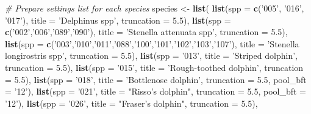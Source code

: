 \documentclass[
]{book}
\newenvironment{Shaded}{\begin{snugshade}}{\end{snugshade}}
\newcommand{\CommentTok}[1]{\textcolor[rgb]{0.56,0.35,0.01}{\textit{#1}}}
\newcommand{\DataTypeTok}[1]{\textcolor[rgb]{0.13,0.29,0.53}{#1}}
\newcommand{\FloatTok}[1]{\textcolor[rgb]{0.00,0.00,0.81}{#1}}
\newcommand{\KeywordTok}[1]{\textcolor[rgb]{0.13,0.29,0.53}{\textbf{#1}}}
\newcommand{\NormalTok}[1]{#1}
\newcommand{\StringTok}[1]{\textcolor[rgb]{0.31,0.60,0.02}{#1}}
\begin{document}
\begin{Shaded}
\begin{Highlighting}[]
\CommentTok{# Prepare settings list for each species}
\NormalTok{species <-}\StringTok{ }\KeywordTok{list}\NormalTok{(}
  \KeywordTok{list}\NormalTok{(}\DataTypeTok{spp =} \KeywordTok{c}\NormalTok{(}\StringTok{'005'}\NormalTok{, }\StringTok{'016'}\NormalTok{, }\StringTok{'017'}\NormalTok{),}
       \DataTypeTok{title =} \StringTok{'Delphinus spp'}\NormalTok{,}
       \DataTypeTok{truncation =} \FloatTok{5.5}\NormalTok{),}
  \KeywordTok{list}\NormalTok{(}\DataTypeTok{spp =} \KeywordTok{c}\NormalTok{(}\StringTok{'002'}\NormalTok{,}\StringTok{'006'}\NormalTok{,}\StringTok{'089'}\NormalTok{,}\StringTok{'090'}\NormalTok{),}
       \DataTypeTok{title =} \StringTok{'Stenella attenuata spp'}\NormalTok{,}
       \DataTypeTok{truncation =} \FloatTok{5.5}\NormalTok{),}
  \KeywordTok{list}\NormalTok{(}\DataTypeTok{spp =} \KeywordTok{c}\NormalTok{(}\StringTok{'003'}\NormalTok{,}\StringTok{'010'}\NormalTok{,}\StringTok{'011'}\NormalTok{,}\StringTok{'088'}\NormalTok{,}\StringTok{'100'}\NormalTok{,}\StringTok{'101'}\NormalTok{,}\StringTok{'102'}\NormalTok{,}\StringTok{'103'}\NormalTok{,}\StringTok{'107'}\NormalTok{),}
       \DataTypeTok{title =} \StringTok{'Stenella longirostris spp'}\NormalTok{,}
       \DataTypeTok{truncation =} \FloatTok{5.5}\NormalTok{),}
  \KeywordTok{list}\NormalTok{(}\DataTypeTok{spp =} \StringTok{'013'}\NormalTok{,}
       \DataTypeTok{title =} \StringTok{'Striped dolphin'}\NormalTok{,}
       \DataTypeTok{truncation =} \FloatTok{5.5}\NormalTok{),}
  \KeywordTok{list}\NormalTok{(}\DataTypeTok{spp =} \StringTok{'015'}\NormalTok{,}
       \DataTypeTok{title =} \StringTok{'Rough-toothed dolphin'}\NormalTok{,}
       \DataTypeTok{truncation =} \FloatTok{5.5}\NormalTok{),}
  \KeywordTok{list}\NormalTok{(}\DataTypeTok{spp =} \StringTok{'018'}\NormalTok{,}
       \DataTypeTok{title =} \StringTok{'Bottlenose dolphin'}\NormalTok{,}
       \DataTypeTok{truncation =} \FloatTok{5.5}\NormalTok{,}
       \DataTypeTok{pool_bft =} \StringTok{'12'}\NormalTok{),}
  \KeywordTok{list}\NormalTok{(}\DataTypeTok{spp =} \StringTok{'021'}\NormalTok{,}
       \DataTypeTok{title =} \StringTok{"Risso's dolphin"}\NormalTok{,}
       \DataTypeTok{truncation =} \FloatTok{5.5}\NormalTok{,}
       \DataTypeTok{pool_bft =} \StringTok{'12'}\NormalTok{),}
  \KeywordTok{list}\NormalTok{(}\DataTypeTok{spp =} \StringTok{'026'}\NormalTok{,}
       \DataTypeTok{title =} \StringTok{"Fraser's dolphin"}\NormalTok{,}
       \DataTypeTok{truncation =} \FloatTok{5.5}\NormalTok{),}

\end{Highlighting}
\end{Shaded}
\end{document}
